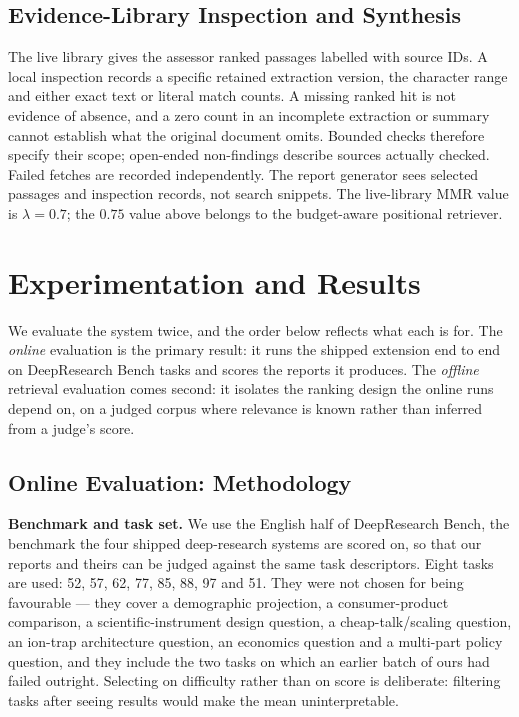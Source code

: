 \documentclass[conference]{IEEEtran}
\begin{document}
\subsection{Evidence-Library Inspection and Synthesis}
The live library gives the assessor ranked passages labelled with source IDs. A local inspection records a specific retained extraction version, the character range and either exact text or literal match counts. A missing ranked hit is not evidence of absence, and a zero count in an incomplete extraction or summary cannot establish what the original document omits. Bounded checks therefore specify their scope; open-ended non-findings describe sources actually checked. Failed fetches are recorded independently. The report generator sees selected passages and inspection records, not search snippets. The live-library MMR value is $\lambda=0.7$; the $0.75$ value above belongs to the budget-aware positional retriever.

\section{Experimentation and Results}

We evaluate the system twice, and the order below reflects what each is for. The \emph{online}
evaluation is the primary result: it runs the shipped extension end to end on DeepResearch Bench tasks
and scores the reports it produces. The \emph{offline} retrieval evaluation comes second: it isolates
the ranking design the online runs depend on, on a judged corpus where relevance is known rather than
inferred from a judge's score.

\subsection{Online Evaluation: Methodology}

\textbf{Benchmark and task set.} We use the English half of DeepResearch Bench, the benchmark the four
shipped deep-research systems are scored on, so that our reports and theirs can be judged against the
same task descriptors. Eight tasks are used: 52, 57, 62, 77, 85, 88, 97 and 51. They were not chosen for
being favourable --- they cover a demographic projection, a consumer-product comparison, a
scientific-instrument design question, a cheap-talk/scaling question, an ion-trap architecture question,
an economics question and a multi-part policy question, and they include the two tasks on which an
earlier batch of ours had failed outright. Selecting on difficulty rather than on score is deliberate:
filtering tasks after seeing results would make the mean uninterpretable.
\end{document}
